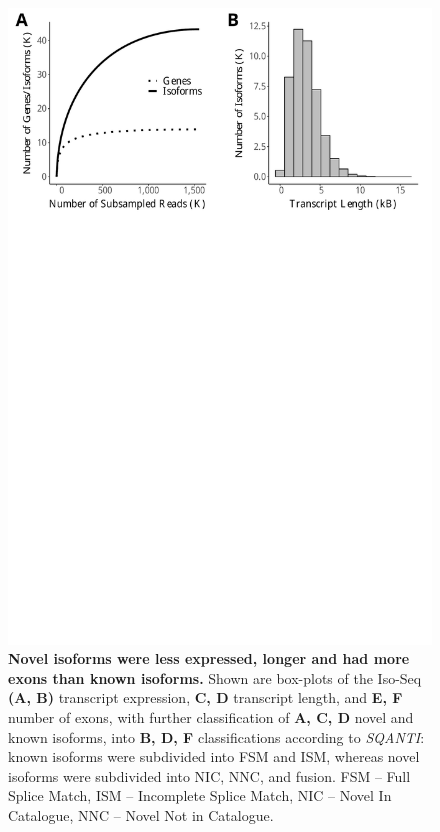 \begin{figure}[!htp]
	\begin{center}
		\includegraphics[page=4,scale = 0.55]{Figures/IsoSeqWholeTranscriptome.pdf}
	\end{center}
	\captionsetup{width=0.95\textwidth}
	\caption[Comparison of known and novel isoforms detected in the mouse cortex]%
	{\textbf{Novel isoforms were less expressed, longer and had more exons than known isoforms.} Shown are box-plots of the Iso-Seq \textbf{(A, B)} transcript expression, \textbf{C, D} transcript length, and \textbf{E, F} number of exons, with further classification of \textbf{A, C, D} novel and known isoforms, into \textbf{B, D, F} classifications according to \textit{SQANTI}: known isoforms were subdivided into FSM and ISM, whereas novel isoforms were subdivided into NIC, NNC, and fusion. FSM – Full Splice Match, ISM – Incomplete Splice Match, NIC – Novel In Catalogue, NNC – Novel Not in Catalogue.}   
	\label{fig:isoseq_whole_novel_known_iso_corr}
\end{figure}
	
